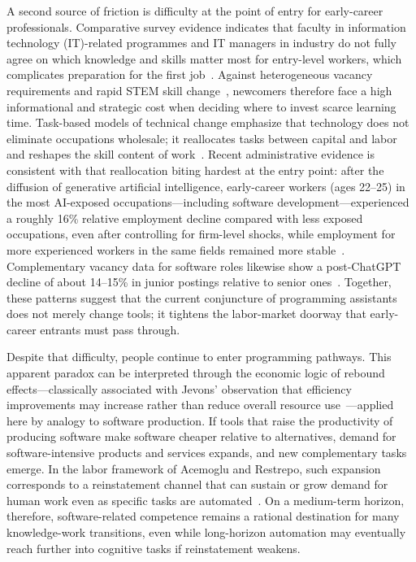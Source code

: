 A second source of friction is difficulty at the point of entry for early-career professionals.
Comparative survey evidence indicates that faculty in information technology (IT)-related programmes and IT managers in industry do not fully agree on which knowledge and skills matter most for entry-level workers, which complicates preparation for the first job~\cite{Aasheim2009}.
Against heterogeneous vacancy requirements and rapid STEM skill change~\cite{Kennan2008,DemingNoray2018}, newcomers therefore face a high informational and strategic cost when deciding where to invest scarce learning time.
Task-based models of technical change emphasize that technology does not eliminate occupations wholesale; it reallocates tasks between capital and labor and reshapes the skill content of work~\cite{AcemogluAutor2010,AcemogluRestrepo2019}.
Recent administrative evidence is consistent with that reallocation biting hardest at the entry point: after the diffusion of generative artificial intelligence, early-career workers (ages 22--25) in the most AI-exposed occupations---including software development---experienced a roughly 16\% relative employment decline compared with less exposed occupations, even after controlling for firm-level shocks, while employment for more experienced workers in the same fields remained more stable~\cite{BrynjolfssonChandarChen2025}.
Complementary vacancy data for software roles likewise show a post-ChatGPT decline of about 14--15\% in junior postings relative to senior ones~\cite{ModestinoWestbyCheng2026}.
Together, these patterns suggest that the current conjuncture of programming assistants does not merely change tools; it tightens the labor-market doorway that early-career entrants must pass through.

Despite that difficulty, people continue to enter programming pathways.
This apparent paradox can be interpreted through the economic logic of rebound effects---classically associated with Jevons' observation that efficiency improvements may increase rather than reduce overall resource use~\cite{vandenBergh2010}---applied here by analogy to software production.
If tools that raise the productivity of producing software make software cheaper relative to alternatives, demand for software-intensive products and services expands, and new complementary tasks emerge.
In the labor framework of Acemoglu and Restrepo, such expansion corresponds to a reinstatement channel that can sustain or grow demand for human work even as specific tasks are automated~\cite{AcemogluRestrepo2019}.
On a medium-term horizon, therefore, software-related competence remains a rational destination for many knowledge-work transitions, even while long-horizon automation may eventually reach further into cognitive tasks if reinstatement weakens.

